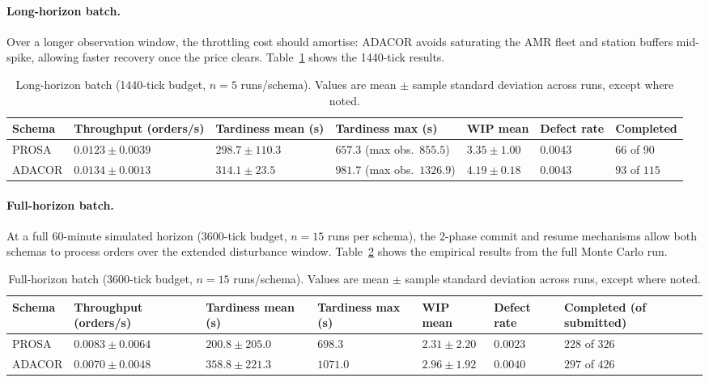 \documentclass[twocolumn,10pt,a4paper]{article}
\begin{document}
\paragraph{Long-horizon batch.} Over a longer observation window, the throttling cost should amortise: ADACOR avoids saturating the AMR fleet and station buffers mid-spike, allowing faster recovery once the price clears. Table~\ref{tab:mc-long} shows the 1440-tick results.

\begin{table}[t]
\centering
\small
\begin{tabular}{@{}lp{2.1cm}p{2.1cm}p{2.1cm}p{2.1cm}p{2.1cm}p{2.3cm}@{}}
\toprule
\textbf{Schema} & \textbf{Throughput (orders/s)} & \textbf{Tardiness mean (s)} & \textbf{Tardiness max (s)} & \textbf{WIP mean} & \textbf{Defect rate} & \textbf{Completed} \\
\midrule
PROSA & $0.0123 \pm 0.0039$ & $298.7 \pm 110.3$ & $657.3$ (max obs.\ $855.5$) & $3.35 \pm 1.00$ & $0.0043$ & $66$ of $90$ \\
ADACOR & $0.0134 \pm 0.0013$ & $314.1 \pm 23.5$ & $981.7$ (max obs.\ $1326.9$) & $4.19 \pm 0.18$ & $0.0043$ & $93$ of $115$ \\
\bottomrule
\end{tabular}
\caption{Long-horizon batch (1440-tick budget, $n=5$ runs/schema). Values are mean $\pm$ sample standard deviation across runs, except where noted.}
\label{tab:mc-long}
\end{table}

\paragraph{Full-horizon batch.} At a full 60-minute simulated horizon ($3600$-tick budget, $n=15$ runs per schema), the 2-phase commit and resume mechanisms allow both schemas to process orders over the extended disturbance window. Table~\ref{tab:mc-very-long} shows the empirical results from the full Monte Carlo run.

\begin{table}[t]
\centering
\small
\begin{tabular}{@{}lp{2.1cm}p{2.1cm}p{2.1cm}p{2.1cm}p{2.1cm}p{2.3cm}@{}}
\toprule
\textbf{Schema} & \textbf{Throughput (orders/s)} & \textbf{Tardiness mean (s)} & \textbf{Tardiness max (s)} & \textbf{WIP mean} & \textbf{Defect rate} & \textbf{Completed (of submitted)} \\
\midrule
PROSA & $0.0083 \pm 0.0064$ & $200.8 \pm 205.0$ & $698.3$ & $2.31 \pm 2.20$ & $0.0023$ & $228$ of $326$ \\
ADACOR & $0.0070 \pm 0.0048$ & $358.8 \pm 221.3$ & $1071.0$ & $2.96 \pm 1.92$ & $0.0040$ & $297$ of $426$ \\
\bottomrule
\end{tabular}
\caption{Full-horizon batch (3600-tick budget, $n=15$ runs/schema). Values are mean $\pm$ sample standard deviation across runs, except where noted.}
\label{tab:mc-very-long}
\end{table}
\end{document}
